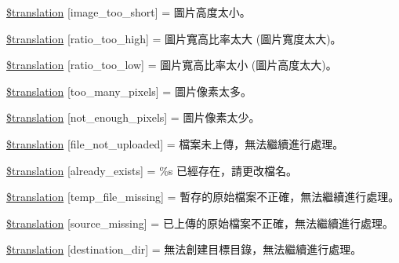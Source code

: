\begin{DoxyCompactItemize}
\item 
\hyperlink{class_8upload_8zh___t_w_8php_a86fcd4e1157b00032df451188d735527}{\$translation} \mbox{[}\textquotesingle{}image\+\_\+too\+\_\+short\textquotesingle{}\mbox{]} = \textquotesingle{}圖片高度太小。\textquotesingle{}
\item 
\hyperlink{class_8upload_8zh___t_w_8php_a23396f6ce7f31e5e5f1b57580621d982}{\$translation} \mbox{[}\textquotesingle{}ratio\+\_\+too\+\_\+high\textquotesingle{}\mbox{]} = \textquotesingle{}圖片寬高比率太大 (圖片寬度太大)。\textquotesingle{}
\item 
\hyperlink{class_8upload_8zh___t_w_8php_ac533b9a479f056b0b8623e4268f068c2}{\$translation} \mbox{[}\textquotesingle{}ratio\+\_\+too\+\_\+low\textquotesingle{}\mbox{]} = \textquotesingle{}圖片寬高比率太小 (圖片高度太大)。\textquotesingle{}
\item 
\hyperlink{class_8upload_8zh___t_w_8php_aa4051ef64e94a3f8295c63cf85544016}{\$translation} \mbox{[}\textquotesingle{}too\+\_\+many\+\_\+pixels\textquotesingle{}\mbox{]} = \textquotesingle{}圖片像素太多。\textquotesingle{}
\item 
\hyperlink{class_8upload_8zh___t_w_8php_a1fe342c27ce61f4ff4e0120ba647033e}{\$translation} \mbox{[}\textquotesingle{}not\+\_\+enough\+\_\+pixels\textquotesingle{}\mbox{]} = \textquotesingle{}圖片像素太少。\textquotesingle{}
\item 
\hyperlink{class_8upload_8zh___t_w_8php_a4ce76e7be0b3a03c2b47f6d70c21832e}{\$translation} \mbox{[}\textquotesingle{}file\+\_\+not\+\_\+uploaded\textquotesingle{}\mbox{]} = \textquotesingle{}檔案未上傳，無法繼續進行處理。\textquotesingle{}
\item 
\hyperlink{class_8upload_8zh___t_w_8php_afd84e910217f04139f567c41e292afa5}{\$translation} \mbox{[}\textquotesingle{}already\+\_\+exists\textquotesingle{}\mbox{]} = \textquotesingle{}\%s 已經存在，請更改檔名。\textquotesingle{}
\item 
\hyperlink{class_8upload_8zh___t_w_8php_ab0fa87a88aba2624004581eed0633325}{\$translation} \mbox{[}\textquotesingle{}temp\+\_\+file\+\_\+missing\textquotesingle{}\mbox{]} = \textquotesingle{}暫存的原始檔案不正確，無法繼續進行處理。\textquotesingle{}
\item 
\hyperlink{class_8upload_8zh___t_w_8php_aceaaf7355acaaf10f0ae60378d03c468}{\$translation} \mbox{[}\textquotesingle{}source\+\_\+missing\textquotesingle{}\mbox{]} = \textquotesingle{}已上傳的原始檔案不正確，無法繼續進行處理。\textquotesingle{}
\item 
\hyperlink{class_8upload_8zh___t_w_8php_aff2427c72a2598aefa6d58df1dd18b08}{\$translation} \mbox{[}\textquotesingle{}destination\+\_\+dir\textquotesingle{}\mbox{]} = \textquotesingle{}無法創建目標目錄，無法繼續進行處理。\textquotesingle{}

\end{DoxyCompactItemize}
